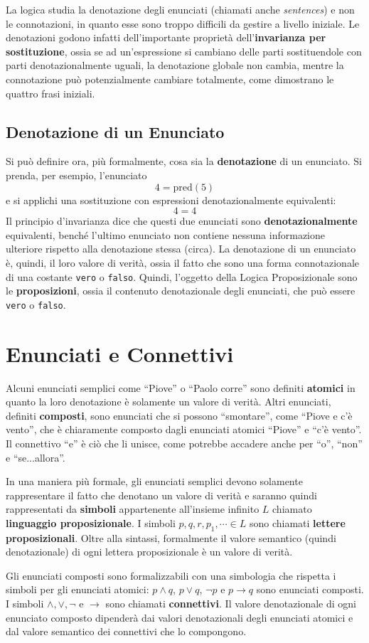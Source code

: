 La logica studia la denotazione degli enunciati (chiamati anche \textit{sentences}) e 
non le connotazioni, in quanto esse sono troppo difficili da gestire a livello 
iniziale. Le denotazioni godono infatti dell'importante proprietà dell'\textbf{invarianza 
per sostituzione}, ossia se ad un'espressione si cambiano delle parti 
sostituendole con parti denotazionalmente uguali, la denotazione globale 
non cambia, mentre la connotazione può potenzialmente cambiare totalmente, 
come dimostrano le quattro frasi iniziali.

\subsection{Denotazione di un Enunciato}
Si può definire ora, più formalmente, cosa sia la \textbf{denotazione} di 
un enunciato. Si prenda, per esempio, l'enunciato
$$
4 = \text{pred}(5)
$$
e si applichi una sostituzione con espressioni denotazionalmente equivalenti: 
$$
4 = 4
$$
Il principio d'invarianza dice che questi due enunciati sono \textbf{denotazionalmente}
equivalenti, benché l'ultimo enunciato non contiene nessuna informazione 
ulteriore rispetto alla denotazione stessa (circa). La denotazione 
di un enunciato è, quindi, il loro valore di verità, ossia il fatto che sono 
una forma connotazionale di una costante \texttt{vero} o \texttt{falso}. 
Quindi, l'oggetto della Logica Proposizionale sono le \textbf{proposizioni}, 
ossia il contenuto denotazionale degli enunciati, che può essere 
\texttt{vero} o \texttt{falso}. 

\section{Enunciati e Connettivi}
Alcuni enunciati semplici come ``Piove'' o ``Paolo corre'' sono definiti 
\textbf{atomici} in quanto la loro denotazione è solamente un valore di 
verità. Altri enunciati, definiti \textbf{composti}, sono enunciati che si possono
``smontare'', come ``Piove e c'è vento'', che è chiaramente composto 
dagli enunciati atomici ``Piove'' e ``c'è vento''. Il connettivo ``e'' è 
ciò che li unisce, come potrebbe accadere anche per ``o'', ``non'' 
e ``se...allora''. 

In una maniera più formale, gli enunciati semplici 
devono solamente rappresentare il fatto che denotano un valore di verità e 
saranno quindi rappresentati da \textbf{simboli} appartenente all'insieme infinito
$L$ chiamato \textbf{linguaggio proposizionale}. I simboli 
$p, q, r, p_1, \cdots \in L$ sono chiamati \textbf{lettere proposizionali}. 
Oltre alla sintassi, formalmente il valore semantico (quindi denotazionale) di ogni 
lettera proposizionale è un valore di verità. 

Gli enunciati composti sono formalizzabili con una simbologia che rispetta 
i simboli per gli enunciati atomici: $p \land q$, $p \lor q$, $\neg p$ e 
$p \rightarrow q$ sono enunciati composti. I simboli $\land, \lor, \neg$ 
e $\rightarrow$ sono chiamati \textbf{connettivi}. Il valore denotazionale 
di ogni enunciato composto dipenderà dai 
valori denotazionali degli enunciati atomici e dal valore semantico dei connettivi 
che lo compongono. 

